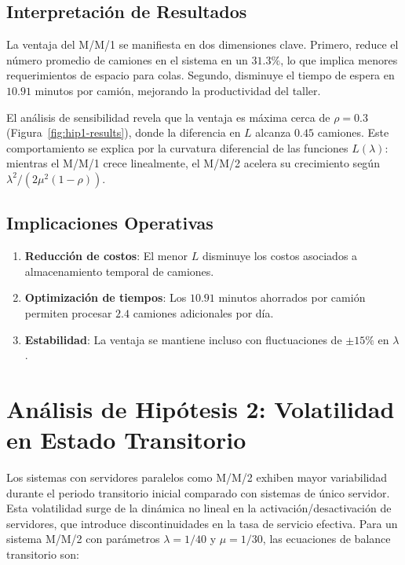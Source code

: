 \documentclass[12pt, a4paper]{article}
\begin{document}
    \subsection{Interpretación de Resultados}
    La ventaja del M/M/1 se manifiesta en dos dimensiones clave. Primero, reduce el número promedio de camiones en el sistema en un $31.3\%$, lo que implica menores requerimientos de espacio para colas. Segundo, disminuye el tiempo de espera en $10.91$ minutos por camión, mejorando la productividad del taller.
    
    El análisis de sensibilidad revela que la ventaja es máxima cerca de $\rho = 0.3$ (Figura~\ref{fig:hip1-results}), donde la diferencia en $L$ alcanza $0.45$ camiones. Este comportamiento se explica por la curvatura diferencial de las funciones $L(\lambda)$: mientras el M/M/1 crece linealmente, el M/M/2 acelera su crecimiento según $\lambda^2/(2\mu^2(1-\rho))$.
    
    \subsection{Implicaciones Operativas}
    \begin{enumerate}
    	\item \textbf{Reducción de costos}: El menor $L$ disminuye los costos asociados a almacenamiento temporal de camiones.
    	\item \textbf{Optimización de tiempos}: Los $10.91$ minutos ahorrados por camión permiten procesar $2.4$ camiones adicionales por día.
    	\item \textbf{Estabilidad}: La ventaja se mantiene incluso con fluctuaciones de $\pm 15\%$ en $\lambda$.
    \end{enumerate}
    
    \section{Análisis de Hipótesis 2: Volatilidad en Estado Transitorio}
    \label{sec:hip5}
    

    Los sistemas con servidores paralelos como M/M/2 exhiben mayor variabilidad durante el periodo transitorio inicial comparado con sistemas de único servidor. Esta volatilidad surge de la dinámica no lineal en la activación/desactivación de servidores, que introduce discontinuidades en la tasa de servicio efectiva. Para un sistema M/M/2 con parámetros $\lambda = 1/40$ y $\mu = 1/30$, las ecuaciones de balance transitorio son:
    
\end{document}
